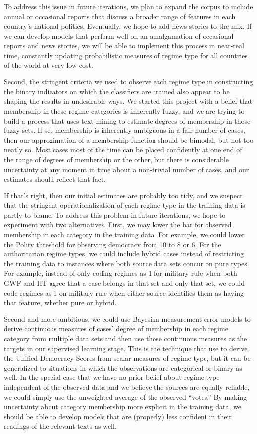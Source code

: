 \documentclass[pdftex,12pt,fullpage,oneside]{amsart}
\begin{document}
To address this issue in future iterations, we plan to expand the corpus to include annual or occasional reports that discuss a broader range of features in each country's national politics. Eventually, we hope to add news stories to the mix. If we can develop models that perform well on an amalgamation of occasional reports and news stories, we will be able to implement this process in near-real time, constantly updating probabilistic measures of regime type for all countries of the world at very low cost.

Second, the stringent criteria we used to observe each regime type in constructing the binary indicators on which the classifiers are trained also appear to be shaping the results in undesirable ways. We started this project with a belief that membership in these regime categories is inherently fuzzy, and we are trying to build a process that uses text mining to estimate degrees of membership in those fuzzy sets. If set membership is inherently ambiguous in a fair number of cases, then our approximation of a membership function should be bimodal, but not too neatly so. Most cases most of the time can be placed confidently at one end of the range of degrees of membership or the other, but there is considerable uncertainty at any moment in time about a non-trivial number of cases, and our estimates should reflect that fact.

If that's right, then our initial estimates are probably too tidy, and we suspect that the stringent operationalization of each regime type in the training data is partly to blame.  To address this problem in future iterations, we hope to experiment with two alternatives. First, we may lower the bar for observed membership in each category in the training data. For example, we could lower the Polity threshold for observing democracy from 10 to 8 or 6. For the authoritarian regime types, we could include hybrid cases instead of restricting the training data to instances where both source data sets concur on pure types. For example, instead of only coding regimes as 1 for military rule when both GWF and HT agree that a case belongs in that set and only that set, we could code regimes as 1 on military rule when either source identifies them as having that feature, whether pure or hybrid.

Second and more ambitious, we could use Bayesian measurement error models to derive continuous measures of cases' degree of membership in each regime category from multiple data sets and then use those continuous measures as the targets in our supervised learning stage. This is the technique that \citet{pemstein:etal:2010} use to derive the Unified Democracy Scores from scalar measures of regime type, but it can be generalized to situations in which the observations are categorical or binary as well. In the special case that we have no prior belief about regime type independent of the observed data and we believe the sources are equally reliable, we could simply use the unweighted average of the observed ``votes.'' By making uncertainty about category membership more explicit in the training data, we should be able to develop models that are (properly) less confident in their readings of the relevant texts as well.
\end{document}
